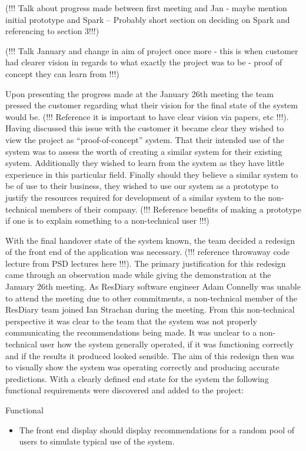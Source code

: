 \documentclass{l3proj}
\begin{document}
(!!! Talk about progress made between first meeting and Jan - maybe mention initial prototype and Spark  -- Probably short section on deciding on Spark and referencing to section 3!!!)

(!!! Talk January and change in aim of project once more - this is when customer had clearer vision in regards to what exactly the project was to be - proof of concept they can learn from !!!)

Upon presenting the progress made at the January 26th meeting the team pressed the customer regarding what their vision for the final state of the system would be. (!!! Reference it is important to have clear vision via papers, etc !!!). Having discussed this issue with the customer it became clear they wished to view the project as “proof-of-concept” system. That their intended use of the system was to assess the worth of creating a similar system for their existing system. Additionally they wished to learn from the system as they have little experience in this particular field. Finally should they believe a similar system to be of use to their business, they wished to use our system as a prototype to justify the resources required for development of a similar system to the non-technical members of their company. (!!! Reference benefits of making a prototype if one is to explain something to a non-technical user !!!) 

With the final handover state of the system known, the team decided a redesign of the front end of the application was necessary. (!!! reference throwaway code lecture from PSD lectures here !!!). The primary justification for this redesign came through an observation made while giving the demonstration at the January 26th meeting. As ResDiary software engineer Adam Connelly was unable to attend the meeting due to other commitments, a non-technical member of the ResDiary team joined Ian Strachan during the meeting. From this non-technical perspective it was clear to the team that the system was not properly communicating the recommendations being made. It was unclear to a non-technical user how the system generally operated, if it was functioning correctly and if the results it produced looked sensible. The aim of this redesign then was to visually show the system was operating correctly and producing accurate predictions. With a clearly defined end state for the system the following functional requirements were discovered and added to the project:

Functional
\begin{itemize}
\item The front end display should display recommendations for a random pool of users to simulate typical use of the system.
\end{itemize}
\end{document}
